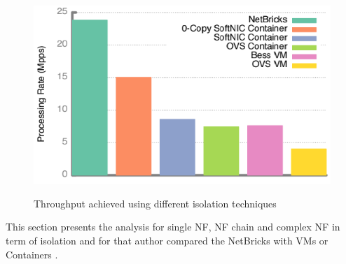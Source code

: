\documentclass[10pt, a4paper, conference]{IEEEtran}
\begin{document}
\begin{figure}
	\centering
	\includegraphics[width=\linewidth]{figures/fig8}
	\caption{Throughput achieved using different isolation techniques}
	\cite{Panda2016}
	\label{key10}
\end{figure}
This section presents the analysis for single NF, NF chain and complex NF in term of isolation and for that author compared the NetBricks with VMs or Containers \cite{Panda2016}. 
\end{document}
